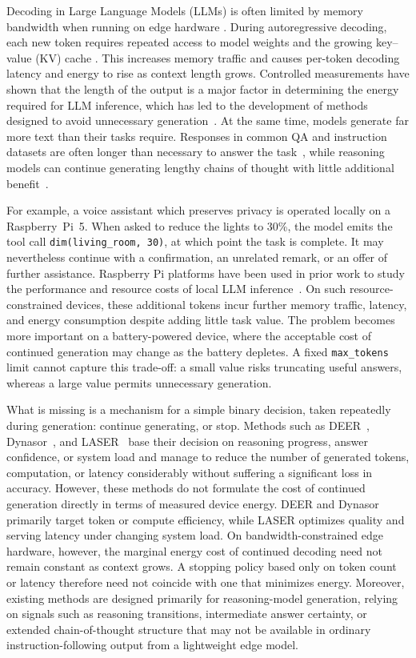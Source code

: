 \documentclass[review,12pt]{elsarticle}
\begin{document}
Decoding in Large Language Models (LLMs) is often limited by memory bandwidth
when running on edge hardware \cite{3692070.3692631}. During autoregressive decoding, each new token requires repeated access to model weights and the growing key--value (KV) cache \cite{3780338.3780461}. This increases memory traffic and causes per-token decoding latency and energy to rise as context length grows. Controlled measurements have shown that the length of the output is a major factor in determining the energy required for LLM inference, which has led to the development of methods designed to avoid unnecessary generation~\cite{poddar-etal-2025-towards}. At the same time, models
generate far more text than their tasks require. Responses in common QA and instruction datasets are often longer than necessary to answer the task~\cite{poddar2025brevity}, while reasoning models can continue generating lengthy chains of thought with little additional benefit~\cite{chen2024overthinking}.

For example, a voice assistant which preserves privacy is operated locally on a Raspberry~Pi~5. When asked to reduce the lights to 30\%, the model emits the tool call \texttt{dim(living\_room, 30)}, at which point the task is complete. It may nevertheless continue with a confirmation, an unrelated remark, or an offer of further assistance. Raspberry Pi platforms have been used in prior work to study the performance and resource costs of local LLM inference~\cite{Ardakani2025LLMPiOL}. On such resource-constrained devices, these additional tokens incur further memory traffic, latency, and energy consumption despite adding little task value. The problem becomes more important on a battery-powered device, where the acceptable cost of continued generation may change as the battery depletes. A fixed \texttt{max\_tokens} limit cannot capture this trade-off: a small value risks truncating useful answers, whereas a large value permits unnecessary generation.

What is missing is a mechanism for a simple binary decision, taken
repeatedly during generation: continue generating, or stop. Methods such as DEER~\cite{yang2025deer}, Dynasor~\cite{fu2025dynasor}, and LASER~\cite{tang2026laser} base their decision on reasoning progress, answer confidence, or system load and manage to reduce the number of generated tokens, computation, or latency considerably without suffering a significant loss in accuracy. However, these methods do not formulate the cost of continued generation directly in terms of measured device energy. DEER and Dynasor primarily target token or compute efficiency, while LASER optimizes quality and serving latency under changing system load. On bandwidth-constrained edge hardware, however, the marginal energy cost of continued decoding need not remain constant as context grows. A stopping policy based only on token count or latency therefore need not coincide with one that minimizes energy. Moreover, existing methods are designed primarily for reasoning-model generation, relying on signals such as reasoning transitions, intermediate answer certainty, or extended chain-of-thought structure that may not be available in ordinary instruction-following output from a lightweight edge model.
\end{document}
